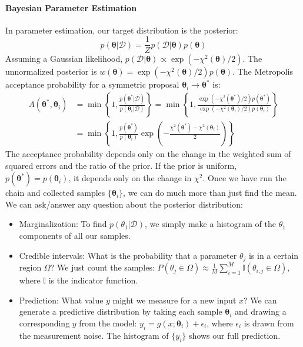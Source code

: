 \paragraph*{Bayesian Parameter Estimation}
In parameter estimation, our target distribution is the posterior:
\begin{equation}
    p(\boldsymbol{\theta}|\mathcal{D}) = \frac{1}{Z} p(\mathcal{D}|\boldsymbol{\theta}) p(\boldsymbol{\theta})
\end{equation}
Assuming a Gaussian likelihood, $p(\mathcal{D}|\boldsymbol{\theta}) \propto \exp(-\chi^2(\boldsymbol{\theta})/2)$. The unnormalized posterior is $w(\boldsymbol{\theta}) = \exp(-\chi^2(\boldsymbol{\theta})/2) p(\boldsymbol{\theta})$.
The Metropolis acceptance probability for a symmetric proposal $\boldsymbol{\theta}_i \to \boldsymbol{\theta}^*$ is:
\begin{align}
    A(\boldsymbol{\theta}^*, \boldsymbol{\theta}_i) &= \min \left\{ 1, \frac{p(\boldsymbol{\theta}^*|\mathcal{D})}{p(\boldsymbol{\theta}_i|\mathcal{D})} \right\}
    = \min \left\{ 1, \frac{\exp(-\chi^2(\boldsymbol{\theta}^*)/2) p(\boldsymbol{\theta}^*)}{\exp(-\chi^2(\boldsymbol{\theta}_i)/2) p(\boldsymbol{\theta}_i)} \right\} \\
    &= \min \left\{ 1, \frac{p(\boldsymbol{\theta}^*)}{p(\boldsymbol{\theta}_i)} \exp\left(-\frac{\chi^2(\boldsymbol{\theta}^*) - \chi^2(\boldsymbol{\theta}_i)}{2}\right) \right\}
\end{align}
The acceptance probability depends only on the change in the weighted sum of squared errors and the ratio of the prior. If the prior is uniform, $p(\boldsymbol{\theta}^*) = p(\boldsymbol{\theta}_i)$, it depends only on the change in $\chi^2$. Once we have run the chain and collected samples $\{\boldsymbol{\theta}_i\}$, we can do much more than just find the mean. We can ask/answer any question about the posterior distribution:
\begin{itemize}
    \item Marginalization: To find $p(\theta_1|\mathcal{D})$, we simply make a histogram of the $\theta_1$ components of all our samples.
    \item Credible intervals: What is the probability that a parameter $\theta_j$ is in a certain region $\Omega$? We just count the samples: $P(\theta_j \in \Omega) \approx \frac{1}{M} \sum_{i=1}^M \mathbb{I}(\theta_{i,j} \in \Omega)$, where $\mathbb{I}$ is the indicator function.
    \item Prediction: What value $y$ might we measure for a new input $x$? We can generate a predictive distribution by taking each sample $\boldsymbol{\theta}_i$ and drawing a corresponding $y$ from the model: $y_i = g(x; \boldsymbol{\theta}_i) + \epsilon_i$, where $\epsilon_i$ is drawn from the measurement noise. The histogram of $\{y_i\}$ shows our full prediction.
\end{itemize}

